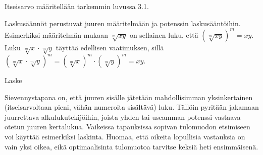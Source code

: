 \begin{esimerkki}
\end{esimerkki}

Itseisarvo määritellään tarkemmin luvussa 3.1. %

Laskusäännöt perustuvat juuren määritelmään ja potenssin laskusääntöihin. Esimerkiksi määritelmän mukaan $\sqrt[m]{xy}$ on sellainen luku, että $\left( \sqrt[m]{xy} \right)^m = xy$. Luku $\sqrt[m]{x} \cdot \sqrt[m]{y}$ täyttää edellisen vaatimuksen, sillä $\left( \sqrt[m]{x} \cdot \sqrt[m]{y} \right)^m = \left( \sqrt[m]{x} \right)^m \cdot \left( \sqrt[m]{y} \right)^m = xy$.

\begin{esimerkki}
Laske
	\begin{esimratk}
	\end{esimratk}
	\begin{esimvast}
	\end{esimvast}
\end{esimerkki}

Sievennystapana on, että juuren sisälle jätetään mahdollisimman yksinkertainen (itseisarvoltaan pieni, vähän numeroita sisältävä) luku. Tällöin pyritään jakamaan juurrettava alkulukutekijöihin, joista yhden tai useamman potenssi vastaava otetun juuren kertalukua. Vaikeissa tapauksissa sopivan tulomuodon etsimiseen voi käyttää esimerkiksi laskinta. Huomaa, että oikeita lopullisia vastauksia on vain yksi oikea, eikä optimaalisinta tulomuotoa tarvitse keksiä heti ensimmäisenä.


